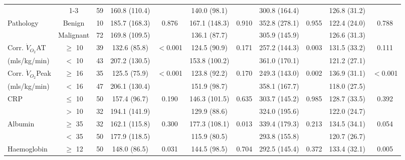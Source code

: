 \begin{sidewaystable}[p]
\begin{tabular}{|l c c | c c| c c | c c | c c|}
		                          & 1-3       & 59 & 160.8 (110.4) &                       & 140.0 (98.1)  &                   & 300.8 (164.4) &                & 126.8 (31.2) &  \\
		Pathology                 & Benign    & 10 & 185.7 (168.3) & 0.876                 & 167.1 (148.3) & 0.910             & 352.8 (278.1) & 0.955          & 122.4 (24.0) & 0.788                 \\
		                          & Malignant & 72 & 169.8 (109.5) &                       & 136.1 (87.7)  &                   & 305.9 (145.9) &                & 126.6 (31.3) &  \\
		Corr. $\dot{V}_{O_2}$AT   & $\geq$ 10 & 39 & 132.6 (85.8)  & $<$0.001              & 124.5 (90.9)  & 0.171             & 257.2 (144.3) & 0.003          & 131.5 (33.2) & 0.111                 \\
		(mls/kg/min)              & $<$ 10    & 43 & 207.2 (130.5) &                       & 153.8 (100.2) &                   & 361.0 (170.1) &                & 121.2 (27.1) &  \\
		Corr. $\dot{V}_{O_2}$Peak & $\geq$ 16 & 35 & 125.5 (75.9)  & $<$0.001              & 123.8 (92.2)  & 0.170             & 249.3 (143.0) & 0.002          & 136.9 (31.1) & $<$0.001              \\
		(mls/kg/min)              & $<$ 16    & 47 & 206.1 (130.4) &                       & 151.9 (98.7)  &                   & 358.1 (167.7) &                & 118.0 (27.5) &  \\
		CRP                       & $\leq$ 10 & 50 & 157.4 (96.7)  & 0.190                 & 146.3 (101.5) & 0.635             & 303.7 (145.2) & 0.985          & 128.7 (33.5) & 0.392                 \\
		                          & $>$ 10    & 32 & 194.1 (141.9) &                       & 129.9 (88.6)  &                   & 324.0 (195.6) &                & 122.0 (24.7) &  \\
		Albumin                   & $\geq$ 35 & 32 & 162.1 (115.8) & 0.300                 & 177.3 (108.1) & 0.013             & 339.4 (179.3) & 0.213          & 134.5 (34.1) & 0.054                 \\
		                          & $<$ 35    & 50 & 177.9 (118.5) &                       & 115.9 (80.5)  &                   & 293.8 (155.8) &                & 120.7 (26.7) &  \\
		Haemoglobin               & $\geq$ 12 & 50 & 148.0 (86.5)  & 0.031                 & 144.5 (98.5)  & 0.704             & 292.5 (145.4) & 0.372          & 133.4 (32.1) & 0.005                 \\

\end{tabular}
\end{sidewaystable}
